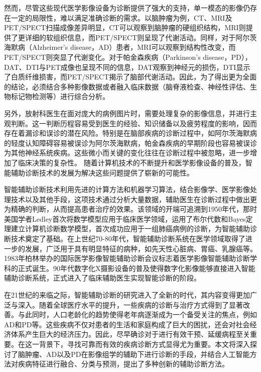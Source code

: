 然而，尽管这些现代医学影像设备为诊断提供了强大的支持，单一模态的影像仍存在一定的局限性，难以满足准确诊断的需求。以脑肿瘤为例，CT、MRI及PET/SPECT扫描成像差异明显，CT可以观察到脑肿瘤的硬组织结构，MRI则提供了更详细的软组织信息，而PET/SPECT则呈现了代谢活动。同样，对于阿尔茨海默病（Alzheimer's disease，AD）患者，MRI可以观察到结构性改变，而PET/SPECT则突显了代谢变化。对于帕金森疾病（Parkinson's disease，PD），DAT、DTI与PET成像也呈现不同的信息，DAT观察到神经元的损伤，DTI显示了白质纤维损害，而PET/SPECT揭示了脑部代谢活动。因此，为了得出更为全面的结论，必须结合多种影像数据或者融入临床数据（脑脊液检查、神经性评估、生物标记物检测等）进行综合分析。

另外，放射科医生在面对庞大的病例图片时，需要处理复杂的影像信息，并进行主观判断。这一判断历程容易受到医生的经验、知识储备以及疲劳程度的影响，因而存在着漏诊和误诊的潜在风险。特别是在脑部疾病的诊断过程中，如阿尔茨海默病的轻度认知障碍容易被误诊为阿尔茨海默病，帕金森疾病的早期阶段也容易被误诊为其他神经系统疾病。这些微小而关键的变化往往在诊断过程中被忽略，进一步增加了临床决策的复杂性。
随着计算机技术的不断提升和医学影像设备的普及，智能辅助诊断技术的发展为解决这些问题提供了崭新的可能性。

    
智能辅助诊断技术利用先进的计算方法和机器学习算法，结合影像学、医学影像处理技术以及其他手段，这项技术通过分析大量数据，辅助医生在诊断过程中做出更为精确的判断，从而提高患者治疗的效果\cite{xenakis1996neglected,weiss1978model,kanthraj1997comparison,economou2001new}。该领域的开端可追溯到1950年代，那时美国学者Ledley首次将数学模型应用于临床医学领域，运用了布尔代数和Bayes定理建立计算机诊断数学模型，首次成功应用于一组肺癌病例的诊断，为智能辅助诊断技术奠定了基础。在上世纪70-80年代，智能辅助诊断系统在医学领域取得了进一步的发展，广泛用于具有明显特征的病种，如先天性心脏病、胃癌、乳腺癌等。1983年柏林举办的国际医学影像智能辅助诊断会议标志着医学影像智能辅助诊断学科的正式诞生。90年代数字化X摄影设备的普及使得数字化影像能够直接进入智能辅助诊断系统，正式进入了临床辅助医生实现智能诊断的阶段。

在21世纪的来临之际，智能辅助诊断的研究进入了全新的时代，其内容变得更加广泛与深入。随着全球医疗水平的提升，一些疾病的诊断与治疗方式得到了显著改善。与此同时，人口老龄化的趋势使得老年病逐渐成为一个备受关注的焦点，例如AD和PD等。这些疾病不仅对患者的生活和家庭构成了巨大的困扰，还会对社会经济体系产生巨大的经济压力。因此，尽早确诊对于进行有效干预、延缓病程至关重要。在这一背景下，寻找可靠而有效的疾病诊断方式显得尤为重要。本文将深入探讨了脑肿瘤、AD以及PD在影像组学的辅助下进行诊断的手段，并结合人工智能方法对疾病特征进行融合、分类与预测，提出了多种创新的辅助诊断方法。

